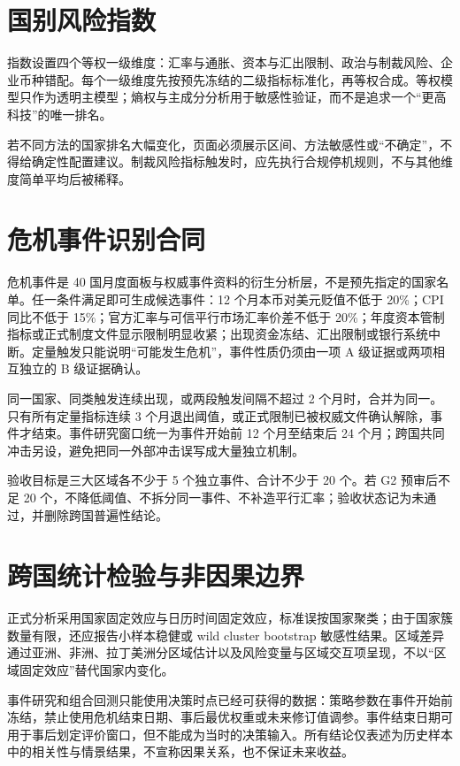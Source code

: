 \documentclass[UTF8,12pt,openany]{ctexbook}
\begin{document}
\section{国别风险指数}
指数设置四个等权一级维度：汇率与通胀、资本与汇出限制、政治与制裁风险、企业币种错配。每个一级维度先按预先冻结的二级指标标准化，再等权合成。等权模型只作为透明主模型；熵权与主成分分析用于敏感性验证，而不是追求一个“更高科技”的唯一排名。

若不同方法的国家排名大幅变化，页面必须展示区间、方法敏感性或“不确定”，不得给确定性配置建议。制裁风险指标触发时，应先执行合规停机规则，不与其他维度简单平均后被稀释。

\section{危机事件识别合同}
危机事件是 40 国月度面板与权威事件资料的衍生分析层，不是预先指定的国家名单。任一条件满足即可生成候选事件：12 个月本币对美元贬值不低于 20\%；CPI 同比不低于 15\%；官方汇率与可信平行市场汇率价差不低于 20\%；年度资本管制指标或正式制度文件显示限制明显收紧；出现资金冻结、汇出限制或银行系统中断。定量触发只能说明“可能发生危机”，事件性质仍须由一项 A 级证据或两项相互独立的 B 级证据确认。

同一国家、同类触发连续出现，或两段触发间隔不超过 2 个月时，合并为同一。只有所有定量指标连续 3 个月退出阈值，或正式限制已被权威文件确认解除，事件才结束。事件研究窗口统一为事件开始前 12 个月至结束后 24 个月；跨国共同冲击另设，避免把同一外部冲击误写成大量独立机制。

验收目标是三大区域各不少于 5 个独立事件、合计不少于 20 个。若 G2 预审后不足 20 个，不降低阈值、不拆分同一事件、不补造平行汇率；验收状态记为未通过，并删除跨国普遍性结论。

\section{跨国统计检验与非因果边界}
正式分析采用国家固定效应与日历时间固定效应，标准误按国家聚类；由于国家簇数量有限，还应报告小样本稳健或 wild cluster bootstrap 敏感性结果。区域差异通过亚洲、非洲、拉丁美洲分区域估计以及风险变量与区域交互项呈现，不以“区域固定效应”替代国家内变化。

事件研究和组合回测只能使用决策时点已经可获得的数据：策略参数在事件开始前冻结，禁止使用危机结束日期、事后最优权重或未来修订值调参。事件结束日期可用于事后划定评价窗口，但不能成为当时的决策输入。所有结论仅表述为历史样本中的相关性与情景结果，不宣称因果关系，也不保证未来收益。
\end{document}
